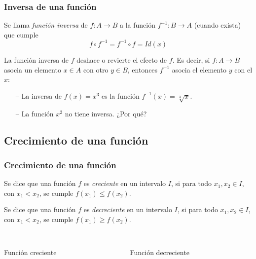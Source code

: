 \begin{frame}
\frametitle{Inversa de una función}
\begin{definicion}
Se llama \emph{función inversa} de $f:A\rightarrow B$ a la función $f^{-1}:B\rightarrow A$ (cuando exista) que cumple
\[
f\circ f^{-1}=f^{-1}\circ f=Id(x)
\]
\end{definicion}

La función inversa de $f$ deshace o revierte el efecto de $f$. 
Es decir, si $f:A\rightarrow B$ asocia un elemento $x\in A$ con otro $y\in B$,
entonces $f^{-1}$ asocia el elemento $y$ con el $x$: 
\begin{center}
\scalebox{1}{}
\end{center}

\begin{itemize}
\item[--] La inversa de $f(x)=x^3$ es la función $f^{-1}(x)=\sqrt[3]{x}.$ 
\item[--] La función $x^2$ no tiene inversa. ¿Por qué?
\end{itemize}
\end{frame} 



\subsection{Crecimiento de una función}
\begin{frame}
\frametitle{Crecimiento de una función}
\begin{definicion}
Se dice que una función $f$ es \emph{creciente} en un intervalo $I$, si para todo $x_1,x_2\in I$, con $x_1<x_2$, se
cumple $f(x_1)\leq f(x_2)$.

Se dice que una función $f$ es \emph{decreciente} en un intervalo $I$, si para todo $x_1,x_2\in I$, con $x_1<x_2$, se
cumple $f(x_1)\geq f(x_2)$.
\end{definicion}

\begin{columns}
\begin{column}{0.4\textwidth}
\begin{center}
\scalebox{1}{}\\
\color{red}Función creciente
\end{center}
\end{column}
\begin{column}{0.4\textwidth}
\begin{center}
\scalebox{1}{}\\
\color{red}Función decreciente
\end{center}
\end{column}
\end{columns}
\end{frame} 



